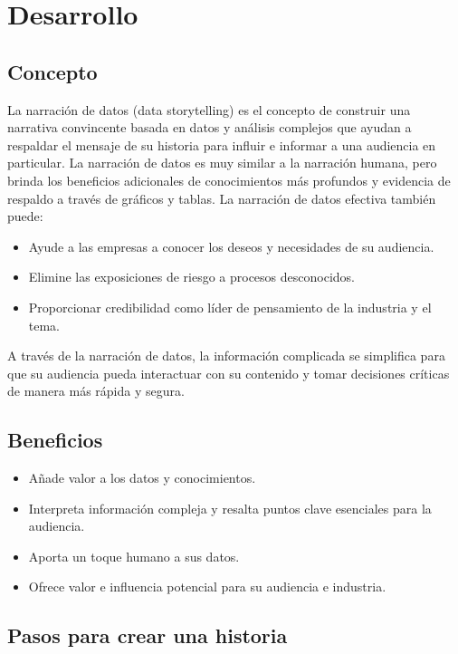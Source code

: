 \documentclass[twoside,twocolumn]{article}
\begin{document}
\section{Desarrollo}


\subsection{Concepto}
La narración de datos (data storytelling) 
es el concepto de construir una narrativa 
convincente basada en datos y análisis 
complejos que ayudan a respaldar el mensaje 
de su historia para influir e informar a 
una audiencia en particular. La narración 
de datos es muy similar a la narración humana, 
pero brinda los beneficios adicionales de conocimientos más profundos y evidencia de respaldo a través de gráficos y tablas. La narración de datos efectiva también puede:
\begin{itemize}
    \item   Ayude a las empresas a conocer los deseos y necesidades de su audiencia. 
    \item   Elimine las exposiciones de riesgo a procesos desconocidos. 
    \item   Proporcionar credibilidad como líder de pensamiento de la industria y el tema. 
\end{itemize}

A través de la narración de datos, 
la información complicada se simplifica 
para que su audiencia pueda interactuar 
con su contenido y tomar decisiones críticas 
de manera más rápida y segura.


\subsection{Beneficios}
\begin{itemize}
    \item   Añade valor a los datos y conocimientos. 
    \item   Interpreta información compleja y resalta puntos clave esenciales para la audiencia. 
    \item   Aporta un toque humano a sus datos.
    \item   Ofrece valor e influencia potencial para su audiencia e industria.
\end{itemize}

\subsection{Pasos para crear una historia}
\end{document}
